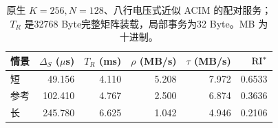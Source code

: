 \begin{table}[htbp]\centering\small
\begin{tabular}{@{}lrrrrr@{}}\toprule
情景 & $\Delta_S$ ($\mu$s) & $T_R$ (ms) & $\rho$ (MB/s) & $\tau$ (MB/s) & $\mathrm{RI}^*$\\\midrule
短 & 49.156 & 4.110 & 5.208 & 7.972 & 0.6533\\
参考 & 102.410 & 4.767 & 2.500 & 6.874 & 0.3636\\
长 & 245.780 & 6.625 & 1.042 & 4.946 & 0.2106\\
\bottomrule\end{tabular}
\caption{原生 $K=256,N=128$、八行电压式近似 ACIM 的配对服务；$T_R$ 是32768 Byte完整矩阵装载，局部事务为32 Byte。MB 为十进制。}\label{07_pcm:tab:results}\end{table}
